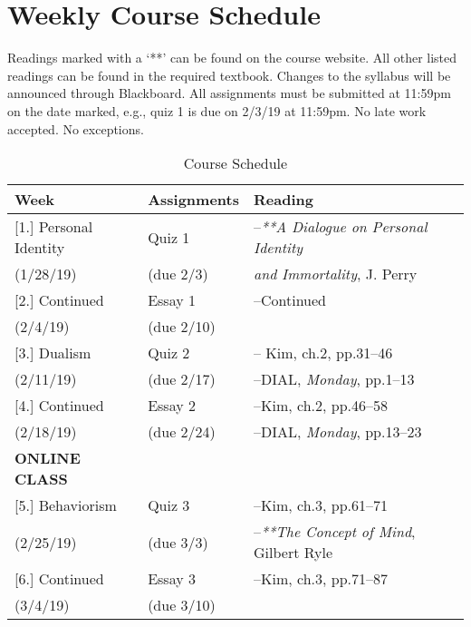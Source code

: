 \documentclass[article,oneside]{memoir}
\begin{document}
\section{Weekly Course Schedule}
Readings marked with a `**' can be found on the course website. All other listed readings can be found in the required textbook. Changes to the syllabus will be announced through Blackboard.  All assignments must be submitted at 11:59pm on the date marked, e.g., quiz 1 is due on 2/3/19 at 11:59pm. No late work accepted. No exceptions.   \newline


\begin{center}
\begin{longtable}{p{4.5cm}p{2cm}p{6cm}}
 
  \caption{Course Schedule} \\
  \toprule
  \textbf{Week} &\textbf{Assignments} & \textbf{Reading} \\
  \midrule

  



[1.] Personal Identity			& Quiz 1			& --\emph{**A Dialogue on Personal Identity } \\
(1/28/19)			        		& (due 2/3)		& \emph{and Immortality}, J. Perry  \\  [1.8\baselineskip]

[2.] Continued			    	& Essay 1    		&  --Continued  \\
(2/4/19)				         & (due 2/10)		&   \\  [1.8\baselineskip]
	
[3.] Dualism			      	& Quiz 2			& -- Kim, ch.2, pp.31--46\\
(2/11/19)				        	& (due 2/17)		& --DIAL, \emph{Monday}, pp.1--13  \\ [1.8\baselineskip]

[4.] Continued			      	& Essay 2			& --Kim, ch.2, pp.46--58 \\
(2/18/19)				        	& (due 2/24)		&--DIAL, \emph{Monday}, pp.13--23 \\ 
\textbf{ONLINE CLASS}		& 				& \\ [1.8\baselineskip]

[5.] Behaviorism		    	& Quiz 3	   		& --Kim, ch.3, pp.61--71 \\
(2/25/19)			        		& (due 3/3)		&  --\emph{**The Concept of Mind}, Gilbert Ryle\\ [1.8\baselineskip]

[6.] Continued		    		& Essay 3	   		& --Kim, ch.3, pp.71--87 \\
(3/4/19)			        		& (due 3/10)		    	  	&  \\ [1.8\baselineskip]


\end{longtable}
\end{center}
\end{document}
